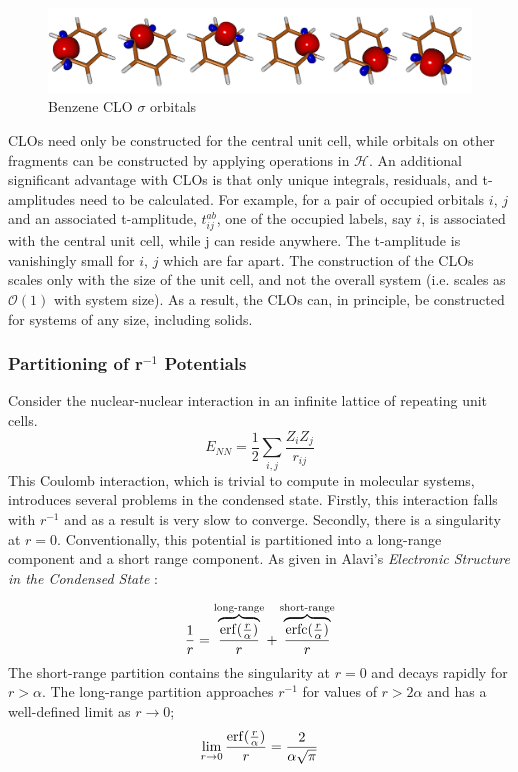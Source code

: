 \documentclass[letterpaper, 12pt]{article}
\DeclareMathOperator\erfc{erfc}
\begin{document}
\begin{figure}
\centering
\includegraphics[scale=2]{Images/CLOBensig.png}
\caption{Benzene CLO  $\sigma$ orbitals}
\label{fig:SigClo}
\end{figure}

CLOs need only be constructed for the central unit cell, while orbitals on other fragments can be constructed by applying operations in $\mathcal{H}$. An additional significant advantage with CLOs is that only unique integrals, residuals, and t-amplitudes need to be calculated. For example, for a pair of occupied orbitals $i, \, j$ and an associated t-amplitude, $t^{ab}_{ij}$, one of the occupied labels, say $i$, is associated with the central unit cell, while j can reside anywhere. The t-amplitude is vanishingly small for $i, \, j$ which are far apart. The construction of the CLOs scales only with the size of the unit cell, and not the overall system (i.e. scales as $\mathcal{O}(1)$ with system size). As a result, the CLOs can, in principle, be constructed for systems of any size, including solids.

\subsubsection{Partitioning of r$^{-1}$ Potentials}
Consider the nuclear-nuclear interaction in an infinite lattice of repeating unit cells. 
\begin{equation}
E_{NN}=\frac{1}{2}\sum_{i,j} \frac{Z_i Z_j}{r_{ij}}
\label{eq:coulomb}
\end{equation}
This Coulomb interaction, which is trivial to compute in molecular systems, introduces several problems in the condensed state.  Firstly, this interaction falls with $r^{-1}$ and as a result is very slow to converge. Secondly, there is a singularity at $r=0$. Conventionally, this potential is partitioned into a long-range component and a short range component. As given in Alavi's \textit{Electronic Structure in the Condensed State} \cite{alavi}:

\begin{equation}
\frac{1}{r} =\overbrace{\frac{\erf({\frac{r}{\alpha}})}{r}}^{\text{long-range}} + \overbrace{\frac{\erfc({\frac{r}{\alpha}})}{r}}^{\text{short-range}}
\label{eq:partition}
\end{equation} 
The short-range partition contains the singularity at $r=0$ and decays rapidly for $r > \alpha$. The long-range partition approaches $r^{-1}$ for values of $r > 2\alpha $ and has a well-defined limit as $r \rightarrow 0$; 
\begin{equation}
\lim_{r \rightarrow 0} \frac{\erf({\frac{r}{\alpha}})}{r} = \frac{2}{\alpha \sqrt{\pi}}
\end{equation}
\end{document}
